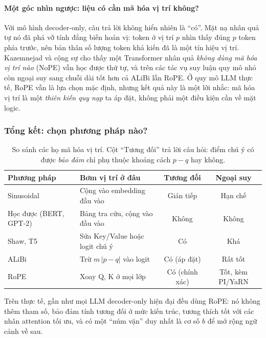 \paragraph{Một góc nhìn ngược: liệu có cần mã hóa vị trí không?} Với mô hình decoder-only, câu trả lời không hiển nhiên là “có”. Mặt nạ nhân quả tự nó đã phá vỡ tính đẳng biến hoán vị: token ở vị trí $p$ nhìn thấy đúng $p$ token phía trước, nên bản thân số lượng token khả kiến đã là một tín hiệu vị trí. Kazemnejad và cộng sự \cite{kazemnejad2023impact} cho thấy một Transformer nhân quả \emph{không dùng mã hóa vị trí nào} (NoPE) vẫn học được thứ tự, và trên các tác vụ suy luận quy mô nhỏ còn ngoại suy sang chuỗi dài tốt hơn cả ALiBi lẫn RoPE. Ở quy mô LLM thực tế, RoPE vẫn là lựa chọn mặc định, nhưng kết quả này là một lời nhắc: mã hóa vị trí là một \emph{thiên kiến quy nạp} ta áp đặt, không phải một điều kiện cần về mặt logic.

\subsubsection{Tổng kết: chọn phương pháp nào?}
\begin{table}[H]
\centering
\small
\begin{tabularx}{\textwidth}{@{}lXcc@{}}
\toprule
\textbf{Phương pháp} & \textbf{Bơm vị trí ở đâu} & \textbf{Tương đối} & \textbf{Ngoại suy} \\
\midrule
Sinusoidal & Cộng vào embedding đầu vào & Gián tiếp & Hạn chế \\
Học được (BERT, GPT-2) & Bảng tra cứu, cộng vào đầu vào & Không & Không \\
Shaw, T5 & Sửa Key/Value hoặc logit chú ý & Có & Khá \\
ALiBi & Trừ $m\,|p-q|$ vào logit & Có (áp đặt) & Rất tốt \\
RoPE & Xoay Q, K ở mọi lớp & Có (chính xác) & Tốt, kèm PI/YaRN \\
\bottomrule
\end{tabularx}
\caption{So sánh các họ mã hóa vị trí. Cột “Tương đối” trả lời câu hỏi: điểm chú ý có được \emph{bảo đảm} chỉ phụ thuộc khoảng cách $p-q$ hay không.}
\label{tab:pe_comparison}
\end{table}
\noindent Trên thực tế, gần như mọi LLM decoder-only hiện đại đều dùng RoPE: nó không thêm tham số, bảo đảm tính tương đối ở mức kiến trúc, tương thích tốt với các nhân attention tối ưu, và có một “núm vặn” duy nhất là cơ số $b$ để mở rộng ngữ cảnh về sau.
